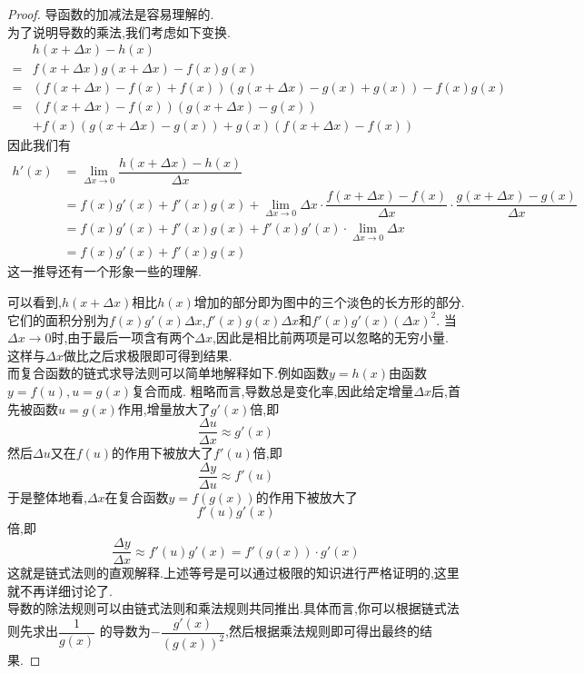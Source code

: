 \documentclass{ctexart}
\begin{document}
\begin{proof}
    导函数的加减法是容易理解的.\\
    为了说明导数的乘法,我们考虑如下变换.
    \[\begin{aligned}
        &h(x+\Delta x)-h(x)\\
        =&f(x+\Delta x)g(x+\Delta x)-f(x)g(x) \\
        =&\left(f(x+\Delta x)-f(x)+f(x)\right)\left(g(x+\Delta x)-g(x)+g(x)\right)-f(x)g(x) \\
        =&\left(f(x+\Delta x)-f(x)\right)\left(g(x+\Delta x)-g(x)\right)\\
        &+f(x)\left(g(x+\Delta x)-g(x)\right)+g(x)\left(f(x+\Delta x)-f(x)\right)
    \end{aligned}\]
    因此我们有
    \[\begin{aligned}
        h'(x)
        &= \lim_{\Delta x\to0}\dfrac{h(x+\Delta x)-h(x)}{\Delta x} \\
        &= f(x)g'(x)+f'(x)g(x)+\lim_{\Delta x\to0}\Delta x\cdot\dfrac{f(x+\Delta x)-f(x)}{\Delta x}\cdot\dfrac{g(x+\Delta x)-g(x)}{\Delta x} \\
        &= f(x)g'(x)+f'(x)g(x)+f'(x)g'(x)\cdot\lim_{\Delta x\to0}\Delta x \\
        &= f(x)g'(x)+f'(x)g(x)
    \end{aligned}\]
    这一推导还有一个形象一些的理解.
    \begin{tightcenter}
        
    \end{tightcenter}
    可以看到,$h(x+\Delta x)$相比$h(x)$增加的部分即为图中的三个淡色的长方形的部分.%
    它们的面积分别为$f(x)g'(x)\Delta x$,$f'(x)g(x)\Delta x$和$f'(x)g'(x)(\Delta x)^2$.%
    当$\Delta x\to0$时,由于最后一项含有两个$\Delta x$,因此是相比前两项是可以忽略的无穷小量.%
    这样与$\Delta x$做比之后求极限即可得到结果.\\
    而复合函数的链式求导法则可以简单地解释如下.例如函数$y=h(x)$由函数$y=f(u),u=g(x)$复合而成.%
    粗略而言,导数总是变化率,因此给定增量$\Delta x$后,首先被函数$u=g(x)$作用,增量放大了$g'(x)$倍,即
    \[\dfrac{\Delta u}{\Delta x}\approx g'(x)\]
    然后$\Delta u$又在$f(u)$的作用下被放大了$f'(u)$倍,即
    \[\dfrac{\Delta y}{\Delta u}\approx f'(u)\]
    于是整体地看,$\Delta x$在复合函数$y=f(g(x))$的作用下被放大了
    \[f'(u)g'(x)\]
    倍,即
    \[\dfrac{\Delta y}{\Delta x}\approx f'(u)g'(x)=f'(g(x))\cdot g'(x)\]
    这就是链式法则的直观解释.上述等号是可以通过极限的知识进行严格证明的,这里就不再详细讨论了.\\
    导数的除法规则可以由链式法则和乘法规则共同推出.具体而言,你可以根据链式法则先求出$\dfrac{1}{g(x)}$%
    的导数为$-\dfrac{g'(x)}{\left(g(x)\right)^2}$,然后根据乘法规则即可得出最终的结果.
\end{proof}
\end{document}
